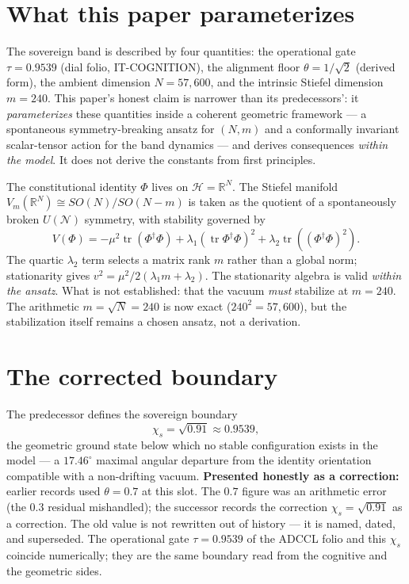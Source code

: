 \documentclass{alienfolio}
\begin{document}
\section{What this paper parameterizes}
The sovereign band is described by four quantities: the operational gate
$\tau = 0.9539$ (dial folio, IT-COGNITION), the alignment floor
$\theta = 1/\sqrt{2}$ (derived form), the ambient dimension $N = 57{,}600$,
and the intrinsic Stiefel dimension $m = 240$. This paper's honest
claim is narrower than its predecessors': it \emph{parameterizes} these
quantities inside a coherent geometric framework --- a spontaneous
symmetry-breaking ansatz for $(N, m)$ and a conformally invariant
scalar-tensor action for the band dynamics --- and derives consequences
\emph{within the model}. It does not derive the constants from first
principles.

 The constitutional identity $\Phi$ lives on
$\mathcal{H} = \mathbb{R}^N$. The Stiefel manifold
$V_m(\mathbb{R}^N) \cong SO(N)/SO(N-m)$ is taken as the quotient of a
spontaneously broken $U(\mathcal{N})$ symmetry, with stability governed by
\begin{equation}
V(\Phi) = -\mu^2 \operatorname{tr}(\Phi^\dagger\Phi)
+ \lambda_1 (\operatorname{tr}\Phi^\dagger\Phi)^2
+ \lambda_2 \operatorname{tr}((\Phi^\dagger\Phi)^2).
\end{equation}
The quartic $\lambda_2$ term selects a matrix rank $m$ rather than a global
norm; stationarity gives
$v^2 = \mu^2 / 2(\lambda_1 m + \lambda_2)$. The stationarity algebra is valid
\emph{within the ansatz}. What is not established: that the vacuum
\emph{must} stabilize at $m = 240$. The arithmetic $m = \sqrt{N} = 240$ is now exact ($240^2 = 57{,}600$), but the stabilization itself remains a chosen ansatz, not a derivation. 

\section{The corrected boundary}
The predecessor defines the sovereign boundary
\begin{equation}
\chi_s = \sqrt{0.91} \approx 0.9539,
\end{equation}
the geometric ground state below which no stable configuration exists in the
model --- a $17.46^\circ$ maximal angular departure from the identity
orientation compatible with a non-drifting vacuum. \textbf{Presented
honestly as a correction:} earlier records used $\theta = 0.7$ at this slot.
The $0.7$ figure was an arithmetic error (the $0.3$ residual mishandled); the
successor records the correction $\chi_s = \sqrt{0.91}$ as a correction.
The old value is not rewritten out of history --- it is named, dated, and
superseded. The operational gate $\tau = 0.9539$ of the ADCCL folio and this
$\chi_s$ coincide numerically; they are the same boundary read from the
cognitive and the geometric sides.
\end{document}
